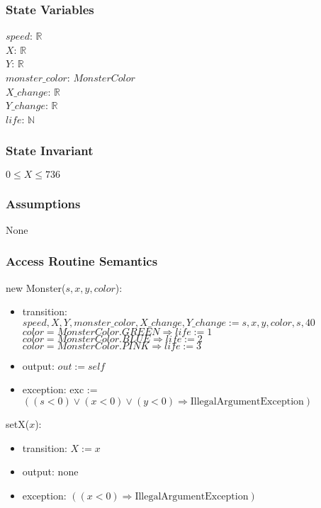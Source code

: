 \documentclass[12pt]{article}
\begin{document}
\subsubsection*{State Variables}
$\mathit{speed}$: $\mathbb{R}$\\
$\mathit{X}$: $\mathbb{R}$\\
$\mathit{Y}$: $\mathbb{R}$\\
$\mathit{monster\_color}$: $MonsterColor$\\
$\mathit{X\_change}$: $\mathbb{R}$\\
$\mathit{Y\_change}$: $\mathbb{R}$\\
$\mathit{life}$: $\mathbb{N}$
\subsubsection*{State Invariant}
$0 \leq X \leq 736$
\subsubsection*{Assumptions}
None
\subsubsection*{Access Routine Semantics}
\noindent new Monster($\mathit{s}, \mathit{x}, \mathit{y}, \mathit{color}$):
\begin{itemize}
\item transition: \\$\mathit{speed}, \mathit{X}, \mathit{Y},
  \mathit{monster\_color}, \mathit{X\_change}, \mathit{Y\_change} := \mathit{s}, \mathit{x},
  \mathit{y}, \mathit{color}, \mathit{s}, 40$\\
  $color = MonsterColor.GREEN \Rightarrow  life := 1$\\
  $color = MonsterColor.BLUE \Rightarrow  life := 2$\\
  $color = MonsterColor.PINK \Rightarrow  life := 3$
\item output: $out := \mathit{self}$
\item exception: exc := $((\mathit{s} < 0) \vee (\mathit{x} < 0) \vee 
  (\mathit{y} < 0) \Rightarrow \text{IllegalArgumentException})$
\end{itemize}

\noindent setX($\mathit{x}$):
\begin{itemize}
\item transition: $X := x$ 
\item output: none
\item exception: $((\mathit{x} < 0) \Rightarrow \text{IllegalArgumentException})$
\end{itemize}
\end{document}
